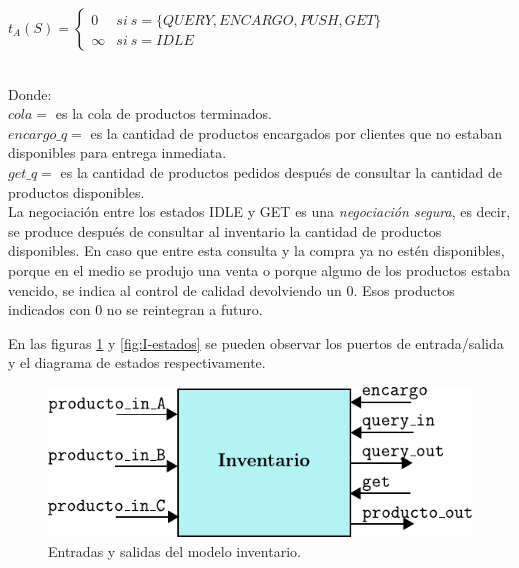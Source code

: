 \documentclass[10pt]{article}
\begin{document}
{\begin{minipage}{0.9\textwidth}
		$t_A(S)=\begin{cases}
		0 & si~s=\{QUERY,ENCARGO,PUSH,GET\}\\
		\infty & si~s=IDLE
		\end{cases}$
	\end{minipage}
}\\

Donde:\\
$cola = $ es la cola de productos terminados.\\ 
$encargo\_q = $ es la cantidad de productos encargados por clientes que no estaban disponibles para entrega inmediata.\\
$get\_q = $ es la cantidad de productos pedidos después de consultar la cantidad de productos disponibles.\\

La negociación entre los estados IDLE y GET es una \textit{negociación segura}, es decir, se produce después de consultar al inventario la cantidad de productos disponibles. En caso que entre esta consulta y la compra ya no estén disponibles, porque en el medio se produjo una venta o porque alguno de los productos estaba vencido, se indica al control de calidad devolviendo un $0$. Esos productos indicados con $0$ no se reintegran a futuro.

En las figuras \ref{fig:I-esquematico} y \ref{fig:I-estados} se pueden observar los puertos de entrada/salida y el diagrama de estados respectivamente.

\begin{figure}[htbp]
	\centering
	\includegraphics{img/I-esquematico}
	\caption{Entradas y salidas del modelo inventario.}
	\label{fig:I-esquematico}
\end{figure}
\end{document}

